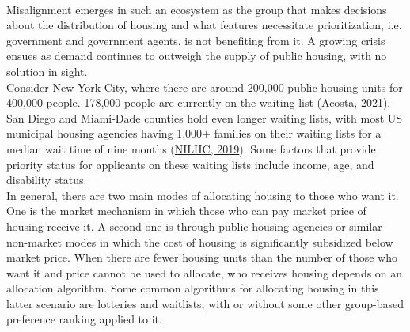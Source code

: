 \documentclass[11pt]{article}
\begin{document}
\\ Misalignment emerges in such an ecosystem as the group that makes decisions about the distribution of housing and what features necessitate prioritization, i.e. government and government agents, is not benefiting from it. A growing crisis ensues as demand continues to outweigh the supply of public housing, with no solution in sight. \\
\newline
Consider New York City, where there are around 200,000 public housing units for 400,000 people. 178,000 people are currently on the waiting list (\href{https://www.cbpp.org/research/housing/long-waitlists-for-housing-vouchers-show-pressing-unmet-need-for-assistance}{Acosta, 2021}). San Diego and Miami-Dade counties hold even longer waiting lists, with most US municipal housing agencies having 1,000+ families on their waiting lists for a median wait time of nine months (\href{https://nlihc.org/news/closed-waiting-lists-and-long-waits-await-those-seeking-affordable-housing-according-new-nlihc#:~:text=Public%20Housing%20provides%20homes%20for,average%20size%20of%20834%20households.}{NILHC, 2019}). Some factors that provide priority status for applicants on these waiting lists include income, age, and disability status. \\
\newline
In general, there are two main modes of allocating housing to those who want it. One is the market mechanism in which those who can pay market price of housing receive it. A second one is through public housing agencies or similar non-market modes in which the cost of housing is significantly subsidized below market price. When there are fewer housing units than the number of those who want it and price cannot be used to allocate, who receives housing depends on an allocation algorithm. Some common algorithms for allocating housing in this latter scenario are lotteries and waitlists, with or without some other group-based preference ranking applied to it.\\
\end{document}
